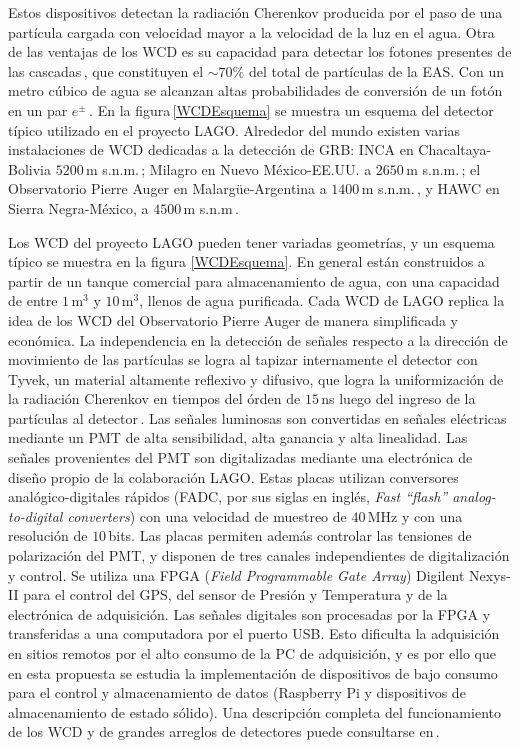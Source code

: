 Estos dispositivos detectan la
radiación Cherenkov producida por el paso de una partícula cargada con
velocidad mayor a la velocidad de la luz en el agua. Otra de las ventajas de
los WCD es su capacidad para detectar los fotones presentes de las
cascadas\,\cite{Allard2007,AllardEtal2008, AllekotteEtal2008}, que constituyen
el $\sim 70\%$ del total de partículas de la EAS. Con un metro cúbico de agua
se alcanzan altas probabilidades de conversión de un fotón en un par
$e^\pm$\,\cite{Asorey2012b}. En la figura\,\ref{WCDEsquema} se muestra un
esquema del detector típico utilizado en el proyecto LAGO. Alrededor del mundo
existen varias instalaciones de WCD dedicadas a la detección de GRB: INCA en
Chacaltaya-Bolivia $5200$\,m s.n.m.\,\cite{Cabrera1999}; Milagro en Nuevo
México-EE.UU. a $2650$\,m s.n.m.\,\cite{Atkins2004}; el Observatorio Pierre
Auger en Malarg\"ue-Argentina a $1400$\,m s.n.m.\,\cite{Abraham2004a}, y HAWC
en Sierra Negra-México, a $4500$\,m s.n.m\,\cite{Abeysekara2012}.

Los WCD del proyecto LAGO pueden tener variadas geometrías, y un esquema típico
se muestra en la figura \ref{WCDEsquema}. En general están construidos a partir
de un tanque comercial para almacenamiento de agua, con una capacidad de entre
$1$\,m$^{3}$ y $10$\,m$^{3}$, llenos de agua purificada. Cada WCD de LAGO
replica la idea de los WCD del Observatorio Pierre Auger de manera simplificada
y económica. La independencia en la detección de señales respecto a la
dirección de movimiento de las partículas se logra al tapizar internamente el
detector con Tyvek, un material altamente reflexivo y difusivo, que logra la
uniformización de la radiación Cherenkov en tiempos del órden de $15$\,ns luego
del ingreso de la partículas al detector\,\cite{Asorey2012b}. Las señales
luminosas son convertidas en señales eléctricas mediante un PMT de alta
sensibilidad, alta ganancia y alta linealidad. Las señales provenientes del PMT
son digitalizadas mediante una electrónica de diseño propio de la colaboración
LAGO. Estas placas utilizan conversores analógico-digitales rápidos (FADC, por
sus siglas en inglés, \textit{Fast ``flash'' analog-to-digital converters}) con
una velocidad de muestreo de $40$\,MHz y con una resolución de $10$\,bits. Las
placas permiten además controlar las tensiones de polarización del PMT, y
disponen de tres canales independientes de digitalización y control. Se utiliza
una FPGA (\textit{Field Programmable Gate Array}) Digilent Nexys-II para el
control del GPS, del sensor de Presión y Temperatura y de la electrónica de
adquisición. Las señales digitales son procesadas por la FPGA y transferidas a
una computadora por el puerto USB. Esto dificulta la adquisición en sitios
remotos por el alto consumo de la PC de adquisición, y es por ello que en esta
propuesta se estudia la implementación de dispositivos de bajo consumo para el
control y almacenamiento de datos (Raspberry Pi y dispositivos de
almacenamiento de estado sólido). Una descripción completa del funcionamiento
de los WCD y de grandes arreglos de detectores puede consultarse
en\,\cite{Asorey2012b}.

